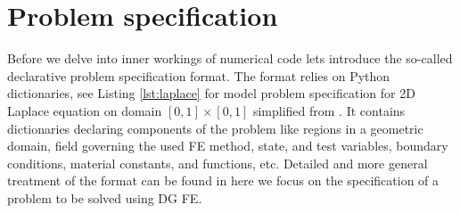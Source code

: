\section{Problem specification}
\label{se:problem_spec}
Before we delve into inner workings of \sfepy{} numerical code lets 
introduce the so-called declarative problem specification format. The format relies on 
Python dictionaries, see Listing \ref{lst:laplace} for model problem specification for 2D 
Laplace equation on domain $[0, 1] \times [0, 1]$ simplified from . It 
contains dictionaries declaring components of the problem like regions in a geometric 
domain, field governing the used FE method, state, and test variables, boundary 
conditions, material constants, and functions, etc. Detailed and more general treatment 
of the format can be found in \cite{Cimrman_Lukes_Rohan_2019} here we focus on the 
specification of a problem to be solved using DG FE.

